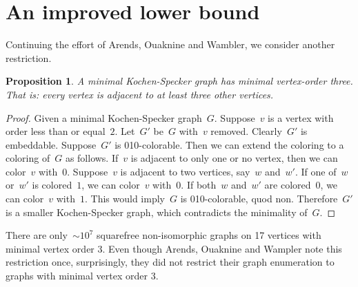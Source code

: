 \documentclass[adraft,copyright,creativecommons]{eptcs}
\newcounter{main}
\newtheorem{prop}[main]{Proposition}
\theoremstyle{definition}
\theoremstyle{remark}
\begin{document}
\section{An improved lower bound}
\label{sec:ilb}
Continuing the effort of Arends, Ouaknine and Wambler,
we consider another restriction.
\begin{prop}
    A minimal Kochen-Specker graph has minimal vertex-order three.
    That is: every vertex is adjacent to at least three other vertices.
\end{prop}
\begin{proof}
    Given a minimal Kochen-Specker graph~$G$.
    Suppose~$v$ is a vertex with order less than or equal~$2$.
    Let~$G'$ be~$G$ with~$v$ removed.
    Clearly~$G'$ is embeddable.
    Suppose~$G'$ is 010-colorable.
    Then we can extend the coloring to a coloring of~$G$ as follows.
    If~$v$ is adjacent to only one or no vertex,
    then we can color~$v$ with~$0$.
    Suppose~$v$ is adjacent to two vertices, say~$w$ and~$w'$.
    If one of~$w$ or~$w'$ is colored~$1$, we can color~$v$ with~$0$.
    If both~$w$ and~$w'$ are colored~$0$, we can color~$v$ with~$1$.
    This would imply~$G$ is 010-colorable, quod non.
    Therefore~$G'$ is a smaller
    Kochen-Specker graph, which contradicts the minimality of~$G$.
\end{proof}
There are only~${\sim}10^7$
squarefree non-isomorphic graphs on 17 vertices with minimal vertex order 3.
Even though Arends, Ouaknine and Wampler
note this restriction once,
surprisingly, they did not restrict their graph enumeration
to graphs with minimal vertex order 3.
\end{document}
